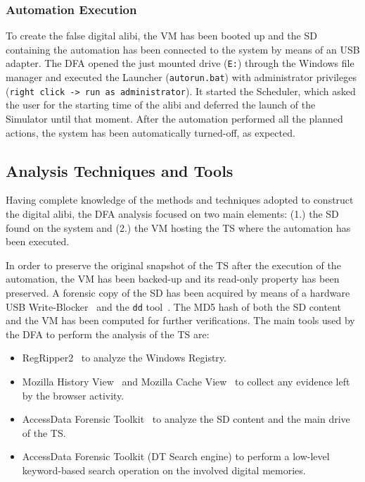 \documentclass[10pt, conference]{IEEEtran}
\begin{document}
\subsubsection{Automation Execution}

To create the false digital alibi, the VM has been booted up and the SD containing the automation has
been connected to the system by means of an USB adapter. The DFA opened the just mounted drive (\verb=E:=) through the Windows file
manager and executed the Launcher (\verb=autorun.bat=) with administrator privileges (\verb=right click -> run as administrator=).
It started the Scheduler, which asked the user for the starting time of the alibi and deferred the launch of the Simulator until that moment. After the automation performed all the planned actions, the system has been automatically turned-off, as expected.

\subsection{Analysis Techniques and Tools}

Having complete knowledge of the methods and techniques adopted to construct the digital alibi, the DFA analysis focused
on two main elements: (1.) the SD found on the system and (2.) the VM hosting the TS where the automation has been executed.

In order to preserve the original snapshot of the TS after the execution of the automation, the VM has been backed-up and its read-only
property has been preserved. 
A forensic copy of the SD has been acquired by means of a hardware USB Write-Blocker~\cite{writeblocker} and the \verb=dd= tool~\cite{dd}. The MD5 hash of both the SD content and the VM has been computed for further verifications.
The main tools used by the DFA to perform the analysis of the TS are:

\begin{itemize}
 \item RegRipper2~\cite{regripper} to analyze the Windows Registry.
 \item Mozilla History View~\cite{mozhistview} and Mozilla Cache View~\cite{mozcacheview} to collect any evidence left by the browser activity.
 \item AccessData Forensic Toolkit~\cite{ftk} to analyze the SD content and the main drive of the TS.
 \item AccessData Forensic Toolkit (DT Search engine) to perform a low-level keyword-based search operation on the involved digital memories.
\end{itemize}
\end{document}
